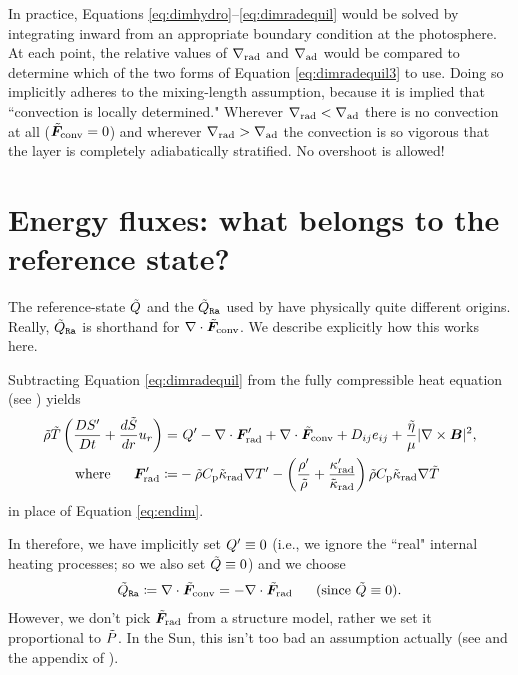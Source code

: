 \documentclass[12pt]{article}
\numberwithin{equation}{section}
\begin{document}
In practice, Equations \eqref{eq:dimhydro}--\eqref{eq:dimradequil} would be solved by integrating inward from an appropriate boundary condition at the photosphere. At each point, the relative values of $\nabla_{\rm rad}$ and $\nabla_{\rm ad}$ would be compared to determine which of the two forms of Equation \eqref{eq:dimradequil3} to use. Doing so implicitly adheres to the mixing-length assumption, because it is implied that ``convection is locally determined." Wherever $\nabla_{\rm rad} <\nabla_{\rm ad}$ there is no convection at all ($\tilde{\bm{F}}_{\rm conv}=0$) and wherever $\nabla_{\rm rad} >\nabla_{\rm ad}$ the convection is so vigorous that the layer is completely adiabatically stratified. No overshoot is allowed! 

\section{Energy fluxes: what belongs to the reference state?}
The reference-state $\tilde{Q}$ and the $\tilde{Q}_{\texttt{Ra}}$ used by {\rayleigh} have physically quite different origins. Really, $\tilde{Q}_{\texttt{Ra}}$ is shorthand for $\nabla\cdot\tilde{\bm{F}}_{\rm conv}$. We describe explicitly how this works here. 

Subtracting Equation \eqref{eq:dimradequil} from the fully compressible heat equation (see \citealt{Matilsky2024b}) yields
\begin{subequations}\label{eq:endim2}
\begin{align}
	\tilde{\rho}\tilde{T} \left(\frac{D{S^\prime}}{Dt} + \frac{d\tilde{S}}{dr} u_r\right) = &\ {Q^\prime} -\nabla\cdot\bm{F}^\prime_{\rm rad}  +\nabla\cdot\tilde{\bm{F}}_{\rm conv}+ D_{ij}e_{ij} + \frac{\tilde{\eta}}{\mu}|\nabla\times\bm{B}|^2,\\
	\text{where}\ \ \ \ \  \bm{F}^\prime_{\rm rad} \coloneqq & -\tilde{\rho} C_{\rm{p}} \tilde{\kappa}_{\rm rad} \nabla{T^\prime} -\left(\frac{{\rho^\prime}}{\tilde{\rho}} + \frac{\kappa^\prime_{\rm rad}}{\tilde{\kappa}_{\rm rad}}\right)\tilde{\rho}C_{\rm{p}}\tilde{\kappa}_{\rm rad}\nabla\tilde{T}
\end{align}
\end{subequations}
in place of Equation \eqref{eq:endim}. 

In {\rayleigh} therefore, we have implicitly set ${Q^\prime}\equiv0$ (i.e., we ignore the ``real" internal heating processes; so we also set $\tilde{Q}\equiv0$) and we choose 
\begin{align}
	\heatra\define \Div\fconvtilde=-\Div\fradtilde\five\text{(since}\ \heattilde\equiv0\text{)}.
\end{align}
However, we don't pick $\tilde{\bm{F}}_{\rm rad}$ from a structure model, rather we set it proportional to $\tilde{P}$. In the Sun, this isn't too bad an assumption actually (see \citealt{Featherstone2016a} and the appendix of \citealt{Matilsky2024}).
\end{document}
